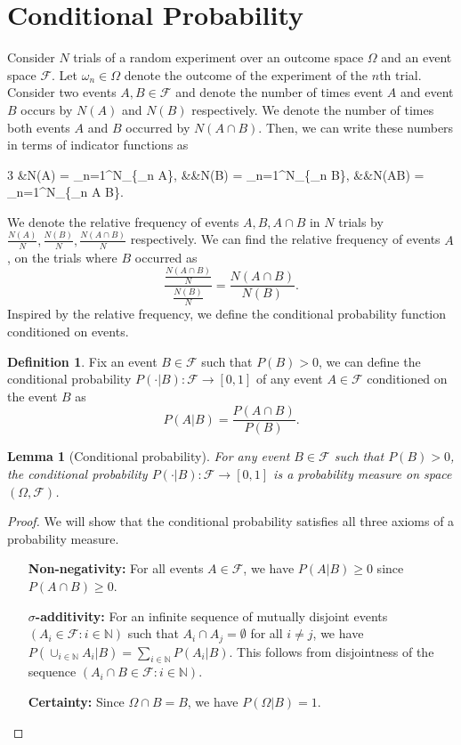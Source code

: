 \documentclass[letterpaper,10pt,english]{article}
\theoremstyle{plain}
\newtheorem{lem}[thm]{Lemma}
\theoremstyle{definition}
\newtheorem{defn}[thm]{Definition}
\theoremstyle{remark}
\newcommand{\EQ}[1]{\begin{equation*}#1\end{equation*}}
\newcommand{\meq}[2]{\begin{xalignat*}{#1}#2\end{xalignat*}}
\newcommand{\set}[1]{\left\{#1\right\}}
\newcommand{\SetIn}[1]{\mathbbm{1}_{\set{#1}}}
\newcommand{\N}{\mathbb{N}}
\newcommand{\sF}{\mathscr{F}}
\renewcommand{\ge}{\geqslant}
\begin{document}
\section{Conditional Probability}
Consider $N$ trials of a random experiment over an outcome space $\Omega$ and an event space $\sF$.  
Let $\omega_n \in \Omega$ denote the outcome of the experiment of the $n$th trial. 
Consider two events $A, B \in \sF$ and denote the number of times event $A$ and event $B$ occurs by $N(A)$ and $N(B)$ respectively. 
We denote the number of times both events $A$ and $B$ occurred by $N(A\cap B)$. 
Then, we can write these numbers in terms of indicator functions as 
\meq{3}{
&N(A) = \sum_{n=1}^N\SetIn{\omega_n \in A}, &&N(B) = \sum_{n=1}^N\SetIn{\omega_n \in B}, &&N(A\cap B) = \sum_{n=1}^N\SetIn{\omega_n \in A \cap B}.
}
We denote the relative frequency of events $A, B, A\cap B$ in $N$ trials by $\frac{N(A)}{N}, \frac{N(B)}{N}, \frac{N(A\cap B)}{N}$ respectively.  
We can find the relative frequency of events $A$, on the trials where $B$ occurred as 
\EQ{
\frac{\frac{N(A\cap B)}{N}}{\frac{N(B)}{N}} = \frac{N(A \cap B)}{N(B)}.
} 
Inspired by the relative frequency, we define the conditional probability function conditioned on events. 
\begin{defn}
Fix an event $B \in \sF$ such that $P(B) > 0$, we can define the conditional probability $P(\cdot | B): \sF \to [0,1]$ of any event $A \in \sF$ conditioned on the event $B$ as 
\EQ{
P(A|B) = \frac{P(A\cap B)}{P(B)}.
}
\end{defn}
\begin{lem}[Conditional probability] 
For any event $B \in \sF$ such that $P(B) > 0$, the conditional probability $P(\cdot | B): \sF \to [0,1]$ is a probability measure on space $(\Omega, \sF)$. 
\end{lem}
\begin{proof} 
We will show that the conditional probability satisfies all three axioms of a probability measure.
\begin{enumerate}
\item  [\textbf{Non-negativity:}] For all events $A \in \sF$, we have $P(A|B) \ge 0$ since $P(A \cap B) \ge 0$. 
\item  [\textbf{$\sigma$-additivity:}] For an infinite sequence of mutually disjoint events $(A_i \in \sF: i \in \N)$ such that $A_i \cap A_j = \emptyset$ for all $i \neq j$, we have $P(\cup_{i \in \N}A_i|B) = \sum_{i \in \N}P(A_i|B)$. 
This follows from disjointness of the sequence $(A_i\cap B \in \sF: i \in \N)$. 
\item [\textbf{Certainty:}] Since $\Omega \cap B = B$, we have $P(\Omega |B) = 1$. 
\end{enumerate} 
\end{proof}
\end{document}
